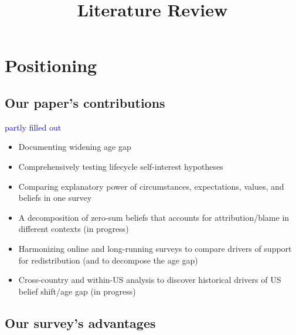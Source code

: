 \documentclass{article}
\title{Literature Review}
\author{}
\date{}
\newcommand{\blue}[1]{\textcolor{blue}{#1}}
\begin{document}
\maketitle
\tableofcontents
\newpage




\section{Positioning}

\subsection{Our paper's contributions}

\blue{partly filled out}

\begin{itemize}
    \item Documenting widening age gap
    \item Comprehensively testing lifecycle self-interest hypotheses
    \item Comparing explanatory power of circumstances, expectations, values, and beliefs in one survey
    \item A decomposition of zero-sum beliefs that accounts for attribution/blame in different contexts (in progress)
    \item Harmonizing online and long-running surveys to compare drivers of support for redistribution (and to decompose the age gap)
    \item Cross-country and within-US analysis to discover historical drivers of US belief shift/age gap (in progress)
\end{itemize}

\subsection{Our survey's advantages}
\end{document}
